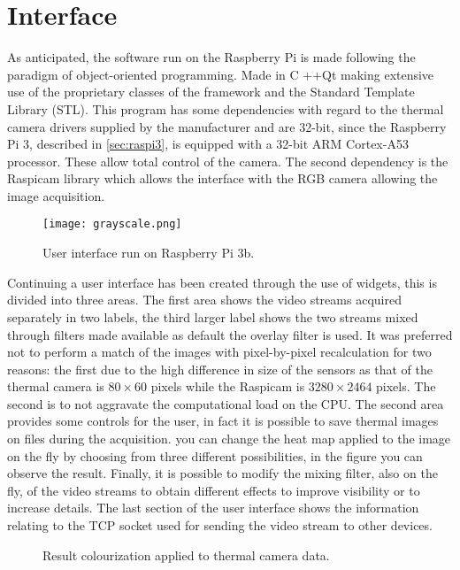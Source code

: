 %
\section{Interface}
\label{sec:raspberry-software}
As anticipated, the software run on the Raspberry Pi is made following the
paradigm of object-oriented programming. Made in C ++\/Qt making extensive use
of the proprietary classes of the framework and the Standard Template Library
(STL). This program has some dependencies with regard to the thermal camera
drivers supplied by the manufacturer and are 32-bit, since the Raspberry Pi 3,
described in \ref{sec:raspi3}, is equipped with a 32-bit ARM Cortex-A53
processor. These allow total control of the camera. The second dependency is the
Raspicam library which allows the interface with the RGB camera allowing the
image acquisition.
%
\begin{figure}[htb]
	\centering
	\texttt{[image: grayscale.png]}
	\caption{User interface run on Raspberry Pi 3b.}
	\label{fig:software-main-ui}
\end{figure}
%
Continuing a user interface has been created through the use of widgets, this is
divided into three areas. The first area shows the video streams acquired
separately in two labels, the third larger label shows the two streams mixed
through filters made available as default the overlay filter is used. It was
preferred not to perform a match of the images with pixel-by-pixel recalculation
for two reasons: the first due to the high difference in size of the sensors as
that of the thermal camera is $80 \times 60$ pixels while the Raspicam is $3280
\times 2464$ pixels. The second is to not aggravate the computational load on
the CPU. The second area provides some controls for the user, in fact it is
possible to save thermal images on files during the acquisition. you can change
the heat map applied to the image on the fly by choosing from three different
possibilities, in the figure you can observe the result. 
Finally, it is possible to modify the mixing filter, also on the fly, of the
video streams to obtain different effects to improve visibility or to increase
details. The last section of the user interface shows the information relating
to the TCP socket used for sending the video stream to other devices.
%
\begin{figure}[htb]
    \centering
     \quad
     \quad
    \caption{Result colourization applied to thermal camera data.}
    \label{fig:reuslt-maps}
\end{figure}
%
